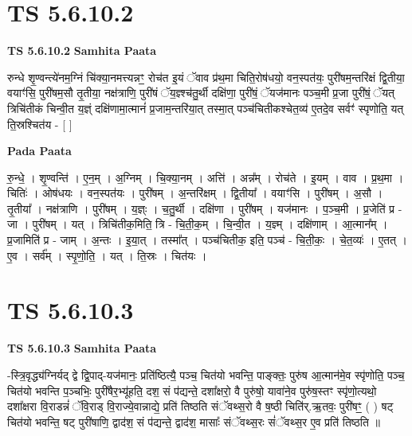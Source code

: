 \documentclass[17pt]{extarticle}
\begin{document}
\section*{ TS 5.6.10.2 }

\textbf{TS 5.6.10.2 } \newline
\textbf{Samhita Paata} \newline

रुन्धे शृ॒ण्वन्त्ये॑नम॒ग्निं चि॑क्या॒नमत्त्यन्नꣳ॒॒ रोच॑त इ॒यं ॅवाव प्र॑थ॒मा चिति॒रोष॑धयो॒ वन॒स्पत॑यः॒ पुरी॑षम॒न्तरि॑क्षं द्वि॒तीया॒ वयाꣳ॑सि॒ पुरी॑षम॒सौ तृ॒तीया॒ नक्ष॑त्राणि॒ पुरी॑षं ॅय॒ज्ञ्श्च॑तु॒र्थी दक्षि॑णा॒ पुरी॑षं॒ ॅयज॑मानः पञ्च॒मी प्र॒जा पुरी॑षं॒ ॅयत् त्रिचि॑तीकं चिन्वी॒त य॒ज्ञ्ं दक्षि॑णामा॒त्मानं॑ प्र॒जाम॒न्तरि॑या॒त् तस्मा॒त् पञ्च॑चितीकश्चेत॒व्य॑ ए॒तदे॒व सर्वꣳ॑ स्पृणोति॒ यत् ति॒स्रश्चित॑य - [  ] \newline

\textbf{Pada Paata} \newline

रु॒न्धे॒ । शृ॒ण्वन्ति॑ । ए॒न॒म् । अ॒ग्निम् । चि॒क्या॒नम् । अत्ति॑ । अन्न᳚म् । रोच॑ते । इ॒यम् । वाव । प्र॒थ॒मा । चितिः॑ । ओष॑धयः । वन॒स्पत॑यः । पुरी॑षम् । अ॒न्तरि॑क्षम् । द्वि॒तीया᳚ । वयाꣳ॑सि । पुरी॑षम् । अ॒सौ । तृ॒तीया᳚ । नक्ष॑त्राणि । पुरी॑षम् । य॒ज्ञ्ः । च॒तु॒र्थी । दक्षि॑णा । पुरी॑षम् । यज॑मानः । प॒ञ्च॒मी । प्र॒जेति॑ प्र - जा । पुरी॑षम् । यत् । त्रिचि॑तीक॒मिति॒ त्रि - चि॒ती॒क॒म् । चि॒न्वी॒त । य॒ज्ञ्म् । दक्षि॑णाम् । आ॒त्मान᳚म् । प्र॒जामिति॑ प्र - जाम् । अ॒न्तः । इ॒या॒त् । तस्मा᳚त् । पञ्च॑चितीक॒ इति॒ पञ्च॑ - चि॒ती॒कः॒ । चे॒त॒व्यः॑ । ए॒तत् । ए॒व । सर्व᳚म् । स्पृ॒णो॒ति॒ । यत् । ति॒स्रः । चित॑यः ।  \newline




\section*{ TS 5.6.10.3 }

\textbf{TS 5.6.10.3 } \newline
\textbf{Samhita Paata} \newline

-स्त्रि॒वृद्ध्य॑ग्निर्यद् द्वे द्वि॒पाद्-यज॑मानः॒ प्रति॑ष्ठित्यै॒ पञ्च॒ चित॑यो भवन्ति॒ पाङ्क्तः॒ पुरु॑ष आ॒त्मान॑मे॒व स्पृ॑णोति॒ पञ्च॒ चित॑यो भवन्ति प॒ञ्चभिः॒ पुरी॑षैर॒भ्यू॑हति॒ दश॒ सं प॑द्यन्ते॒ दशा᳚क्षरो॒ वै पुरु॑षो॒ यावा॑ने॒व पुरु॑ष॒स्तꣳ स्पृ॑णो॒त्यथो॒ दशा᳚क्षरा वि॒राडन्नं॑ ॅवि॒राड् वि॒राज्ये॒वान्नाद्ये॒ प्रति॑ तिष्ठति संॅवथ्स॒रो वै ष॒ष्ठी चिति॑र्.ऋ॒तवः॒ पुरी॑षꣳ॒॒ ( ) षट् चित॑यो भवन्ति॒ षट् पुरी॑षाणि॒ द्वाद॑श॒ सं प॑द्यन्ते॒ द्वाद॑श॒ मासाः᳚ संॅवथ्स॒रः सं॑ॅवथ्स॒र ए॒व प्रति॑ तिष्ठति ॥ \newline
\end{document}
